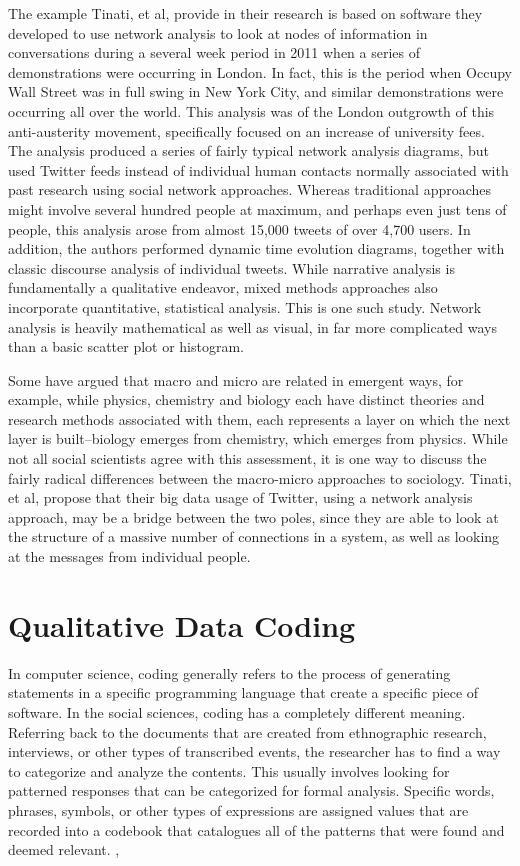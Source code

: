 \documentclass[sigconf]{acmart}
\begin{document}
The example Tinati, et al, provide in their research is based on software they developed to use network analysis to look at nodes of information in conversations during a several week period in 2011 when a series of demonstrations were occurring in London. \cite{tinati14} In fact, this is the period when Occupy Wall Street was in full swing in New York City, and similar demonstrations were occurring all over the world.  This analysis was of the London outgrowth of this anti-austerity movement, specifically focused on an increase of university fees.  The analysis produced a series of fairly typical network analysis diagrams, but used Twitter feeds instead of individual human contacts normally associated with past research using social network approaches.  Whereas traditional approaches might involve several hundred people at maximum, and perhaps even just tens of people, this analysis arose from almost 15,000 tweets of over 4,700 users.  In addition, the authors performed dynamic time evolution diagrams, together with classic discourse analysis of individual tweets.  While narrative analysis is fundamentally a qualitative endeavor, mixed methods approaches also incorporate quantitative, statistical analysis.  This is one such study.  Network analysis is heavily mathematical as well as visual, in far more complicated ways than a basic scatter plot or histogram. \cite{tinati14}

Some have argued that macro and micro are related in emergent ways, for example, while physics, chemistry and biology each have distinct theories and research methods associated with them, each represents a layer on which the next layer is built--biology emerges from chemistry, which emerges from physics. \cite{sawyer07}  While not all social scientists agree with this assessment, it is one way to discuss the fairly radical differences between the macro-micro approaches to sociology.  Tinati, et al, propose that their big data usage of Twitter, using a network analysis approach, may be a bridge between the two poles, since they are able to look at the structure of a massive number of connections in a system, as well as looking at the messages from individual people. \cite{tinati14} 

\section{Qualitative Data Coding}
In computer science, coding generally refers to the process of generating statements in a specific programming language that create a specific piece of software.  In the social sciences, coding has a completely different meaning.  Referring back to the documents that are created from ethnographic research, interviews, or other types of transcribed events, the researcher has to find a way to categorize and analyze the contents.  This usually involves looking for patterned responses that can be categorized for formal analysis.  Specific words, phrases, symbols, or other types of expressions are assigned values that are recorded into a codebook that catalogues all of the patterns that were found and deemed relevant. \cite{singleton18}, \cite{bryman16}
\end{document}
